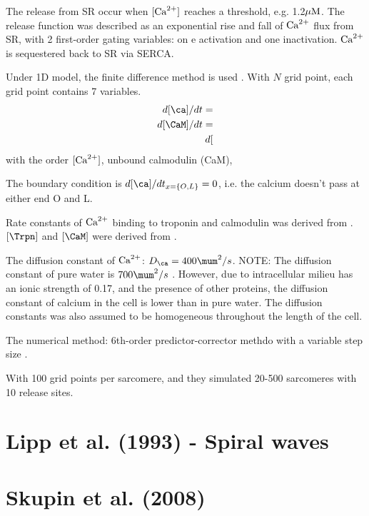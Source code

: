 The release from SR occur when $[{\text{Ca}^{2+}}]$ reaches a threshold, e.g. 1.2${\mu\text{M}}$. The
release function was described as an exponential rise and fall of ${\text{Ca}^{2+}}$ flux
from SR, with 2 first-order gating variables: on e activation and one
inactivation. ${\text{Ca}^{2+}}$ is sequestered back to SR via SERCA. 

Under 1D model, the finite difference method is used \citep{cannell1984,
crank1975}. With $N$ grid point, each grid point contains 7 variables.
\begin{equation}
\begin{split}
d[\ca]/dt = \\ 
d[\CaM]/dt  = \\
d[
\end{split}
\end{equation}
with the order $[{\text{Ca}^{2+}}]$, unbound calmodulin (CaM), 

The boundary condition is $d[\ca]/dt_{x=\{O,L\}}=0$, i.e. the calcium doesn't
pass at either end O and L.  

Rate constants of ${\text{Ca}^{2+}}$ binding to troponin and calmodulin was derived from
\citep{robertson1981, potter1981}. $[\Trpn]$ and $[\CaM]$ were derived from
\citep{wier1986}.

The diffusion constant of ${\text{Ca}^{2+}}$: $D_\ca = 400 \mum^2/s$. NOTE: The diffusion
constant of pure water is $700 \mum^2/s$ \citep{wang1953}. However, due to
intracellular milieu has an ionic strength of 0.17, and the presence of other
proteins, the diffusion constant of calcium in the cell is lower than in pure
water. The diffusion constants was also assumed to be homogeneous throughout the
length of the cell.

 The numerical method: 6th-order predictor-corrector methdo with a
variable step size \citep{gear1971}.

With 100 grid points per sarcomere, and they simulated 20-500 sarcomeres with 10
release sites.



\section{Lipp et al. (1993) - Spiral waves}

\citep{lipp1993}


\section{Skupin et al. (2008) }

\citep{skupin2008}

